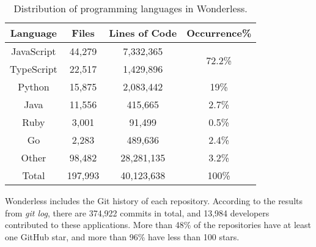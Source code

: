 \begin{table}[h]
	\begin{center}
		\caption{Distribution of programming languages in Wonderless.}
		\label{tab:pl}
		\begin{tabular}{c|c|c|c}
			\textbf{Language} & \textbf{Files} & \textbf{Lines of Code} & \textbf{Occurrence\%} \\
			\toprule
			JavaScript &  44,279 & 7,332,365 & \multirow{2}{*}{72.2\%} \\
			TypeScript & 22,517 & 1,429,896 &  \\ \midrule
			Python & 15,875 & 2,083,442 & 19\% \\ \midrule
			Java & 11,556 & 415,665 & 2.7\%  \\ \midrule
			Ruby & 3,001 & 91,499 & 0.5\%  \\ \midrule
			Go & 2,283 & 489,636 & 2.4\% \\ \midrule
			Other & 98,482 & 28,281,135 & 3.2\% \\ \midrule
			Total & 197,993 & 40,123,638 & 100\% \\ \midrule
		\end{tabular}
	\end{center}
\vspace{-7mm}
\end{table}

Wonderless includes the Git history of each repository. 
According to the results from \emph{git log}, there are 374,922 commits in total, 
and 13,984 developers contributed to these applications.
More than 48\% of the repositories have at least one 
GitHub star, and more than 96\% have less than 100 stars.



